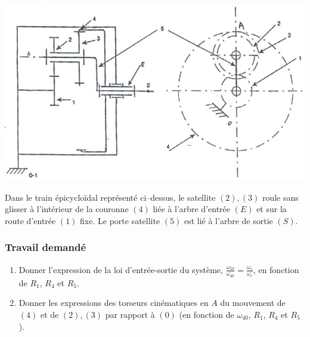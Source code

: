 
\begin{center}
    \includegraphics[scale=0.5]{png/1_exo10.png}
\end{center}

Dans le train épicycloïdal représenté ci–dessus, le satellite ${(2),(3)}$ roule sans glisser à l'intérieur de la couronne $(4)$ liée à l'arbre d'entrée $(E)$ et sur la route d'entrée $(1)$ fixe. Le porte satellite $(5)$ est lié à l'arbre de sortie $(S)$.

\subsubsection{Travail demandé}
\begin{enumerate}
\item Donner l'expression de la loi d'entrée-sortie du système, $\frac{\omega_{50}}{\omega_{40}}=\frac{\omega_s}{\omega_e}$, en fonction de $R_1$, $R_4$ et $R_5$.
\item Donner les expressions des torseurs cinématiques en $A$ du mouvement de $(4)$ et de ${(2),(3)}$ par rapport à $(0)$ (en fonction de $\omega_{40}$, $R_1$, $R_4$ et $R_5$).
\end{enumerate}

\newpage

